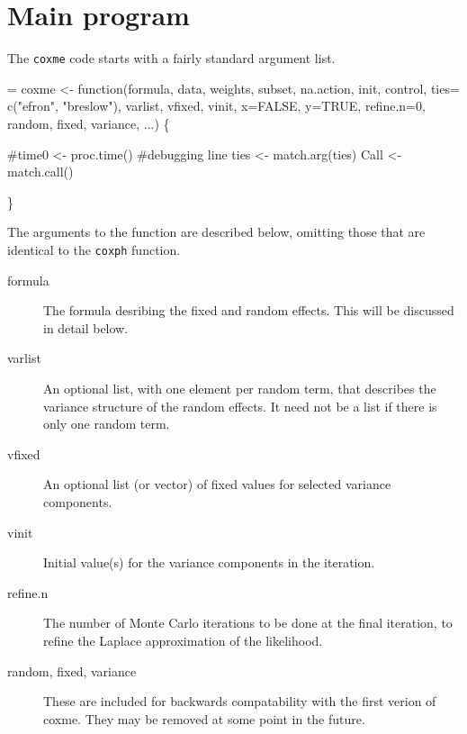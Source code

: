 \documentclass{article}
\begin{document}
\section{Main program}
The \Verb!coxme! code starts with a fairly standard argument list.
\begin{nwchunk}
=
 coxme <- function(formula,  data, 
         weights, subset, na.action, init, 
         control, ties= c("efron", "breslow"),
         varlist, vfixed, vinit,
         x=FALSE, y=TRUE, 
         refine.n=0, random, fixed, variance,  ...) \{
 
     #time0 <- proc.time()    #debugging line
     ties <- match.arg(ties)
     Call <- match.call()
 
 \}
\end{nwchunk}

The arguments to the function are described below,
omitting those that are identical to the \Verb!coxph! function.
\begin{description}
\item[formula] The formula desribing the fixed and random effects.  This
will be discussed in detail below.
\item[varlist] An optional list, with one element per random term, that
describes the variance structure of the random effects.  It need not
be a list if there is only one random term.
\item[vfixed] An optional list (or vector) of fixed values for 
selected variance
components.  
\item[vinit] Initial value(s) for the variance components in the iteration.
\item[refine.n] The number of Monte Carlo iterations to be done at the final
iteration, to refine the Laplace approximation of the likelihood.
\item[random, fixed, variance] These are included for backwards compatability 
with the first verion of coxme.  They may be removed at some
point in the future.
\end{description}
\end{document}
